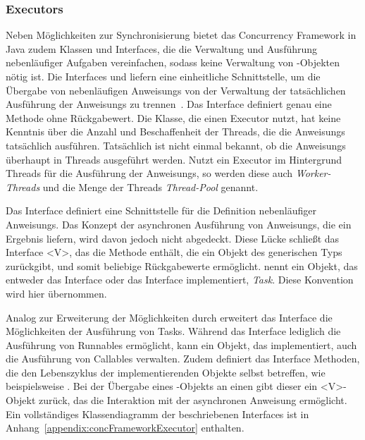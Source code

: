 \subsubsection{Executors}\label{sec:executor} Neben Möglichkeiten zur Synchronisierung bietet das Concurrency Framework in Java zudem Klassen und Interfaces, die die Verwaltung und Ausführung nebenläufiger Aufgaben vereinfachen, sodass keine Verwaltung von \classThread{}-Objekten nötig ist. Die Interfaces \classExecutor{} und \classExecutorService{} liefern eine einheitliche Schnittstelle, um die Übergabe von nebenläufigen \glspl{Anweisung} von der Verwaltung der tatsächlichen Ausführung der \glspl{Anweisung} zu trennen~\cite[S.~70~ff.]{Friesen2015}. Das Interface \classExecutor{} definiert genau eine Methode  ohne Rückgabewert. Die Klasse, die einen Executor nutzt, hat keine Kenntnis über die Anzahl und Beschaffenheit der Threads, die die \glspl{Anweisung} tatsächlich ausführen. Tatsächlich ist nicht einmal bekannt, ob die \glspl{Anweisung} überhaupt in Threads ausgeführt werden. Nutzt ein Executor im Hintergrund Threads für die Ausführung der \glspl{Anweisung}, so werden diese auch \emph{Worker-Threads} und die Menge der Threads \emph{Thread-Pool} genannt.

Das Interface \classRunnable{} definiert eine Schnittstelle für die Definition nebenläufiger \glspl{Anweisung}. Das Konzept der asynchronen Ausführung von \glspl{Anweisung}, die ein Ergebnis liefern, wird davon jedoch nicht abgedeckt. Diese Lücke schließt das Interface \classCallable<V>{}, das die Methode  enthält, die ein Objekt des generischen Typs  zurückgibt, und somit beliebige Rückgabewerte ermöglicht. \textcite{Friesen2015} nennt ein Objekt, das entweder das Interface \classRunnable{} oder das Interface \classCallable{} implementiert, \emph{Task}. Diese Konvention wird hier übernommen. 

Analog zur Erweiterung der Möglichkeiten durch \classCallable{} erweitert das Interface \classExecutorService{} die Möglichkeiten der Ausführung von Tasks. Während das Interface \classExecutor{} lediglich die Ausführung von Runnables ermöglicht, kann ein Objekt, das \classExecutorService{} implementiert, auch die Ausführung von Callables verwalten. Zudem definiert das Interface Methoden, die den Lebenszyklus der implementierenden Objekte selbst betreffen, wie beispielsweise . Bei der Übergabe eines -Objekts an einen \classExecutorService{} gibt dieser ein \classFuture<V>{}-Objekt zurück, das die Interaktion mit der asynchronen \gls{Anweisung} ermöglicht. Ein vollständiges Klassendiagramm der beschriebenen Interfaces ist in Anhang~\ref{appendix:concFrameworkExecutor} enthalten.

